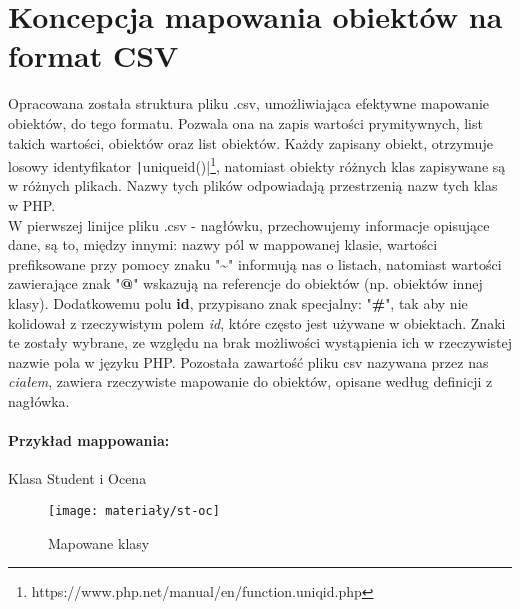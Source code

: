 \section{Koncepcja mapowania obiektów na format CSV}

Opracowana została struktura pliku .csv, umożliwiająca efektywne mapowanie obiektów, do tego formatu. Pozwala ona na zapis wartości prymitywnych, list takich wartości, obiektów oraz list obiektów. Każdy zapisany obiekt, otrzymuje losowy identyfikator \texttt|uniqueid()|\footnote{https://www.php.net/manual/en/function.uniqid.php}, natomiast obiekty różnych klas zapisywane są w różnych plikach. Nazwy tych plików odpowiadają przestrzenią nazw tych klas w PHP. \\ \newline
W pierwszej linijce pliku .csv - nagłówku, przechowujemy informacje opisujące dane, są to, między innymi: nazwy pól w mappowanej klasie, wartości prefiksowane przy pomocy znaku "\textbf{\~}" informują nas o listach, natomiast wartości zawierające znak "\textbf{@}" wskazują na referencje do  obiektów (np. obiektów innej klasy). Dodatkowemu polu \textbf{id}, przypisano znak specjalny: "\textbf{\#}", tak aby nie kolidował z rzeczywistym polem \textit{id}, które często jest używane w obiektach. Znaki te zostały wybrane, ze względu na brak możliwości wystąpienia ich w rzeczywistej nazwie pola w języku PHP. Pozostała zawartość pliku csv nazywana przez nas \textit{ciałem}, zawiera rzeczywiste mapowanie do obiektów, opisane według definicji z nagłówka.

\paragraph{Przykład mappowania:} Klasa Student i Ocena 



\begin{figure}[ht]
	\centering
	\texttt{[image: materiały/st-oc]}
	\caption{Mapowane klasy}
\end{figure}


